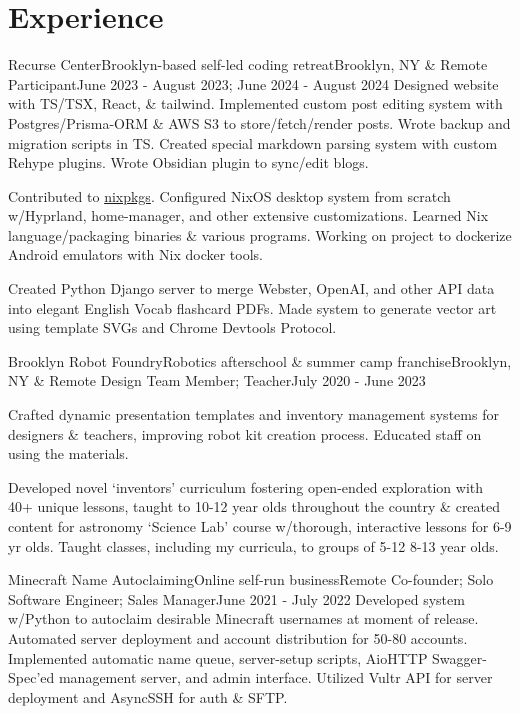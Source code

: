 \documentclass[letterpaper, 10pt]{article}
\begin{document}
\resumeSubHeadingListEnd

\section{Experience}
\resumeSubHeadingListStart


\resumeSubheading
{Recurse Center}{Brooklyn-based self-led coding retreat}{Brooklyn, NY \& Remote}
{Participant}{June 2023 - August 2023; June 2024 - August 2024}{}
\resumeItemListStart
{}
{Designed website with TS/TSX, React, \& tailwind. Implemented custom post editing system with Postgres/Prisma-ORM \& AWS S3 to store/fetch/render posts. Wrote backup and migration scripts in TS. Created special markdown parsing system with custom Rehype plugins. Wrote Obsidian plugin to sync/edit blogs.}

{Contributed to \href{https://github.com/NixOS/nixpkgs}{nixpkgs}. Configured NixOS desktop system from scratch w/Hyprland, home-manager, and other extensive customizations. Learned Nix language/packaging binaries \& various programs. Working on project to dockerize Android emulators with Nix docker tools.}

{Created Python Django server to merge Webster, OpenAI, and other API data into elegant English Vocab flashcard PDFs. Made system to generate vector art using template SVGs and Chrome Devtools Protocol.}
\resumeItemListEnd

\resumeSubheading
{Brooklyn Robot Foundry}{Robotics afterschool \& summer camp franchise}{Brooklyn, NY \& Remote}
{Design Team Member; Teacher}{July 2020 - June 2023}{}

\resumeItemListStart
{}
{Crafted dynamic presentation templates and inventory management systems for designers \& teachers, improving robot kit creation process. Educated staff on using the materials.}

{Developed novel `inventors' curriculum fostering open-ended exploration with 40+ unique lessons, taught to 10-12 year olds throughout the country \& created content for astronomy `Science Lab' course w/thorough, interactive lessons for 6-9 yr olds. Taught classes, including my curricula, to groups of 5-12 8-13 year olds.}
\resumeItemListEnd

\resumeSubheading
{Minecraft Name Autoclaiming}{Online self-run business}{Remote}
{Co-founder; Solo Software Engineer; Sales Manager}{June 2021 - July 2022}{}
\resumeItemListStart
{}
{Developed system w/Python to autoclaim desirable Minecraft usernames at moment of release. Automated server deployment and account distribution for 50-80 accounts. Implemented automatic name queue, server-setup scripts, AioHTTP Swagger-Spec'ed management server, and admin interface. Utilized Vultr API for server deployment and AsyncSSH for auth \& SFTP.}
\end{document}
